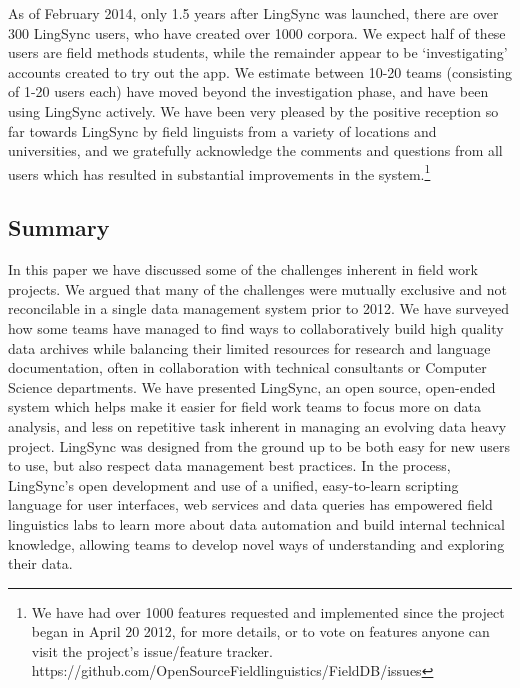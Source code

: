 \documentclass[letterpaper, 12pt, dvips]{mitwpl}
\begin{document}
As of February 2014, only 1.5 years after LingSync was launched, there are over 300 LingSync users,
who have created over 1000 corpora.
We expect half of these users are field methods students, while the remainder appear to be `investigating' accounts created to try out the app.
We estimate between 10-20 teams (consisting of 1-20 users each) have moved beyond the investigation phase, and have been using LingSync actively. We have been very pleased by the positive reception so far towards LingSync by field linguists from a variety of locations and universities, and we gratefully acknowledge the comments and questions from all users which has resulted in substantial improvements in the system.\footnote{We have had over 1000 features requested and implemented since the project began in April 20 2012, for more details, or to vote on features anyone can visit the project's issue/feature tracker. \\https://github.com/OpenSourceFieldlinguistics/FieldDB/issues }

\subsection{Summary}
\label{sec:summary} 

In this paper we have discussed some of the challenges inherent in field work projects. 
We argued that many of the challenges were mutually exclusive and not reconcilable in a single data management system prior to 2012. 
We have surveyed how some teams have managed to find ways to collaboratively build high quality data archives while balancing  their limited resources for research and language documentation, often in collaboration with technical consultants or Computer Science departments. 
We have presented LingSync, an open source, open-ended system which helps make it easier for field work teams to focus more on data analysis,  and less on 
 repetitive task inherent in managing an evolving data heavy project. 
LingSync was designed from the ground up to be both easy for new users to use, but also respect data management best practices. In the process, LingSync's open development and use of a unified, easy-to-learn scripting language for user interfaces, web services and data queries has empowered field linguistics labs to learn more about data automation and build internal technical knowledge, allowing teams to develop novel ways of understanding and exploring their data. %
\end{document}
